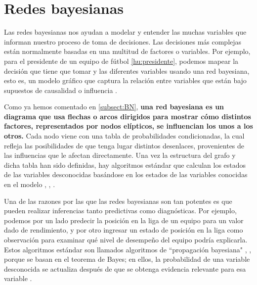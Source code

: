 \section{Redes bayesianas}

Las redes bayesianas nos ayudan a modelar y entender las muchas variables que informan nuestro proceso de 
toma de decisiones. Las decisiones más complejas están normalmente basadas en una multitud de factores o 
variables. Por ejemplo, para el presidente de un equipo de fútbol \ref{hu:presidente}, podemos 
mapear la decisión que tiene que tomar y las diferentes variables usando 
una red bayesiana, esto es, un modelo gráfico que captura la relación entre variables que están bajo 
supuestos de causalidad o influencia \cite{things-to-know-BN}.

Como ya hemos comentado en \ref{subsect:BN}, \textbf{una red bayesiana es un diagrama que 
usa flechas o arcos dirigidos para mostrar cómo distintos factores, representados por nodos elípticos, se 
influencian los unos a los otros.} Cada nodo viene con una tabla de probabilidades condicionadas, la cual 
refleja las posibilidades de que tenga lugar distintos desenlaces, provenientes de las influencias que 
le afectan directamente. Una vez la estructura del grafo y dicha tabla han sido definidas, hay algoritmos 
estándar que calculan los estados de las variables desconocidas basándose en los estados de las variables 
conocidas en el modelo \cite{learning-algorithms-BN-comparison}, \cite{BN-achilles-heel}, 
\cite{different-algorithmic-schemes}.

Una de las razones por las que las redes bayesianas son tan potentes es que pueden realizar inferencias 
tanto predictivas como diagnósticas. Por ejemplo, podemos por un lado predecir la posición en la liga de 
un equipo para un valor dado de rendimiento, y por otro ingresar un estado de posición en la 
liga como observación para examinar qué nivel de desempeño del equipo podría explicarla. Estos algoritmos 
estándar son llamados algoritmos de ``propagación bayesiana" \cite{Cano2004}, \cite{more-algorithms}, 
\cite{back-prop} porque se basan en el teorema de Bayes; en ellos, la probabilidad de una variable 
desconocida se actualiza después de que se obtenga evidencia relevante para esa variable \cite{prop-alg}.

